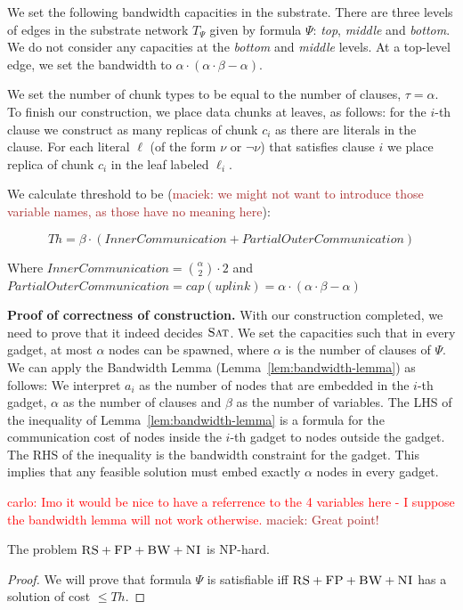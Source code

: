 \documentclass[9pt]{sigcomm-alternate}
\newcommand{\carlo}[1]{\textcolor{red}{carlo: #1}}
\newcommand{\maciek}[1]{\textcolor{brown}{maciek: #1}}
\newcommand{\variab}{\nu}
\newcommand{\clauses}{\alpha}
\newcommand{\variables}{\beta}
\newcommand{\achunk}{\ensuremath{c}}
\newcommand{\CC}{\textsc{NI}}
\newcommand{\FP}{\textsc{FP}}
\newcommand{\RS}{\textsc{RS}}
\newcommand{\BW}{\textsc{BW}}
\newcommand{\Tree}{\ensuremath{T}}
\newcommand{\SAT}{\textsc{Sat}}
\newcommand{\Formula}{\ensuremath{\Psi}}
\newcommand{\Thr}{\ensuremath{Th}}
\begin{document}
\begin{appendix}
We set the following bandwidth capacities in the substrate. There are three
levels of edges in the substrate network $\Tree_{\Formula}$ given by formula
$\Formula$: \emph{top}, \emph{middle} and \emph{bottom}.
We do not consider any capacities at the \emph{bottom} and \emph{middle} levels.
At a top-level edge, we set the bandwidth to $\clauses \cdot (\clauses
\cdot \variables -
\clauses)$.

We set the number of chunk types to be equal to the number of clauses, $\tau =
\clauses$. To finish our construction, we place data chunks at
leaves, as follows: for the $i$-th clause we
construct as many replicas of chunk $\achunk_i$ as there are literals in the
clause. For each literal $\ell$ (of the form $\variab$ or $\neg \variab$) that satisfies clause $i$ we place
replica of chunk $\achunk_i$ in the leaf labeled $\ell_i$.

We calculate threshold to be (\maciek{we might not want to introduce
  those variable names, as those have no meaning here}):

$$ \Thr = \variables \cdot (InnerCommunication +
PartialOuterCommunication)$$

Where $InnerCommunication = {\clauses  \choose 2} \cdot 2$ and
$PartialOuterCommunication = cap(uplink) = \clauses \cdot (\clauses
\cdot \variables - \clauses)$

\textbf{Proof of correctness of construction.}
With our construction completed, we need to prove that it indeed
decides $\SAT$. We set the capacities such that in every gadget,
at most $\clauses$ nodes can be spawned, where $\clauses$
is the number of clauses of $\Formula$.
We can apply the Bandwidth Lemma (Lemma~\ref{lem:bandwidth-lemma}) as follows:
We interpret $a_i$ as the
number of nodes that are embedded in the $i$-th gadget, $\clauses$
as the number
of clauses and $\variables$ as the number of variables.
The LHS of the inequality of Lemma~\ref{lem:bandwidth-lemma}
is a formula for the communication cost of nodes inside the $i$-th
gadget to nodes outside the gadget. The RHS of the inequality is the
bandwidth constraint for the gadget. This implies that
any feasible solution must embed exactly $\clauses$ nodes in every gadget.

\carlo{Imo it would be nice to have a referrence to the 4 variables here - I
suppose the bandwidth lemma will not work otherwise.} \maciek{Great point!}


\begin{theorem}
The problem $\RS+\FP+\BW+\CC$ is NP-hard.
\end{theorem}
\begin{proof}
We will prove that formula $\Formula$ is satisfiable iff $\RS+\FP+\BW+\CC$ has
a solution of cost $\leq \Thr$.


\end{proof}
\end{appendix}
\end{document}
